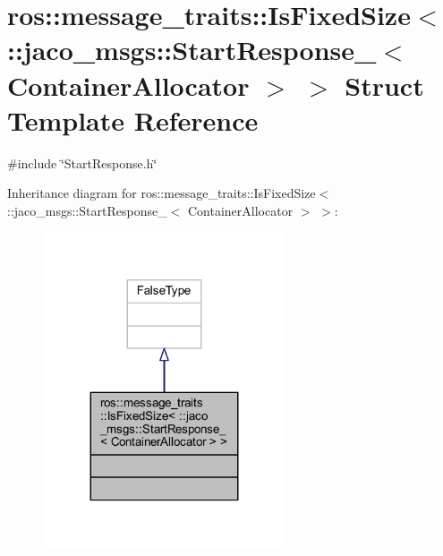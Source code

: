 \hypertarget{structros_1_1message__traits_1_1IsFixedSize_3_01_1_1jaco__msgs_1_1StartResponse___3_01ContainerAllocator_01_4_01_4}{}\section{ros\+:\+:message\+\_\+traits\+:\+:Is\+Fixed\+Size$<$ \+:\+:jaco\+\_\+msgs\+:\+:Start\+Response\+\_\+$<$ Container\+Allocator $>$ $>$ Struct Template Reference}
\label{structros_1_1message__traits_1_1IsFixedSize_3_01_1_1jaco__msgs_1_1StartResponse___3_01ContainerAllocator_01_4_01_4}


{\ttfamily \#include \char`\"{}Start\+Response.\+h\char`\"{}}



Inheritance diagram for ros\+:\+:message\+\_\+traits\+:\+:Is\+Fixed\+Size$<$ \+:\+:jaco\+\_\+msgs\+:\+:Start\+Response\+\_\+$<$ Container\+Allocator $>$ $>$\+:
\nopagebreak
\begin{figure}[H]
\begin{center}
\leavevmode
\includegraphics[width=203pt]{d3/d03/structros_1_1message__traits_1_1IsFixedSize_3_01_1_1jaco__msgs_1_1StartResponse___3_01ContainerA671a3c19ee6eaa189356f1707df4e3b2}
\end{center}
\end{figure}


